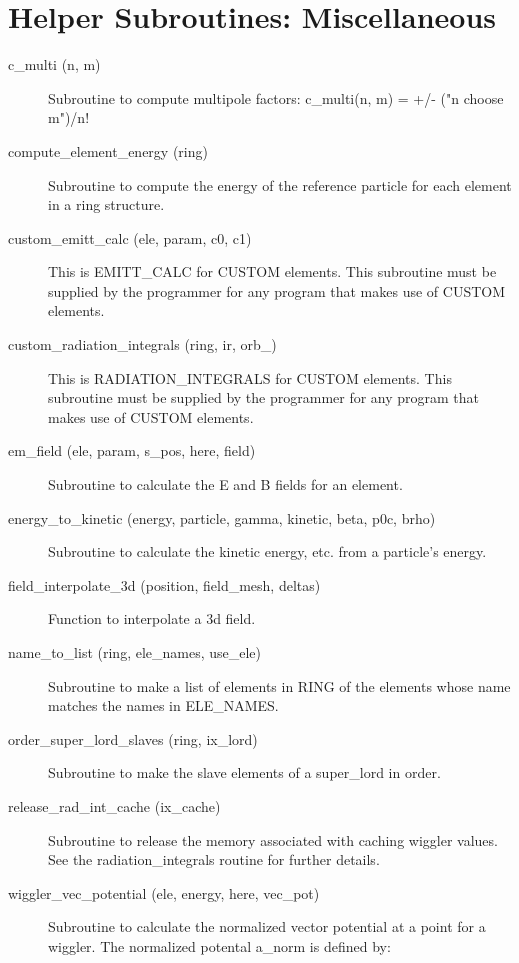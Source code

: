\section{Helper Subroutines: Miscellaneous}
\label{r:misc_help}

\begin{description}

\item[c\_multi (n, m)] \Newline
Subroutine to compute multipole factors: c\_multi(n, m) = +/- ("n choose m")/n! 

\item[compute\_element\_energy (ring)] \Newline
Subroutine to compute the energy of the reference particle for each element in a ring structure. 

\item[custom\_emitt\_calc (ele, param, c0, c1)] \Newline
This is EMITT\_CALC for CUSTOM elements. This subroutine must be supplied 
by the programmer for any program that makes use of CUSTOM elements. 

\item[custom\_radiation\_integrals (ring, ir, orb\_)] \Newline
This is RADIATION\_INTEGRALS for CUSTOM elements. This subroutine must be 
supplied by the programmer for any program that makes use of CUSTOM elements. 

\item[em\_field (ele, param, s\_pos, here, field)] \Newline
Subroutine to calculate the E and B fields for an element. 

\item[energy\_to\_kinetic (energy, particle, gamma, kinetic, beta, p0c, brho)] \Newline
Subroutine to calculate the kinetic energy, etc. from a particle's energy. 

\item[field\_interpolate\_3d (position, field\_mesh, deltas)] \Newline
Function to interpolate a 3d field. 

\item[name\_to\_list (ring, ele\_names, use\_ele)] \Newline
Subroutine to make a list of elements in RING of the elements 
whose name matches the names in ELE\_NAMES. 

\item[order\_super\_lord\_slaves (ring, ix\_lord)] \Newline
Subroutine to make the slave elements of a super\_lord in order. 

\item[release\_rad\_int\_cache (ix\_cache)] \Newline 
     Subroutine to release the memory associated with caching wiggler values.
     See the radiation\_integrals routine for further details.

\item[wiggler\_vec\_potential (ele, energy, here, vec\_pot)] \Newline
Subroutine to calculate the normalized vector potential at a point for a wiggler. 
The normalized potental a\_norm is defined by: 

\end{description}

